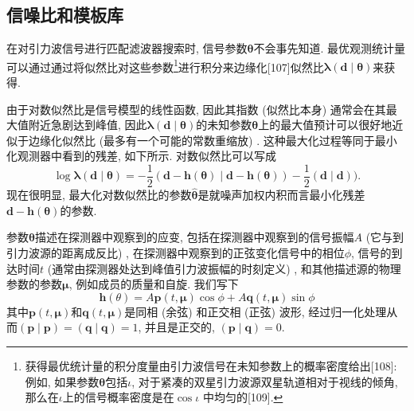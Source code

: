 \documentclass[a4paper]{\documentclassname}
\def\b{\boldsymbol}
\theoremstyle{definition}
\begin{document}
\subsection{信噪比和模板库}

在对引力波信号进行匹配滤波器搜索时, 信号参数$\b{\theta}$不会事先知道. 最优观测统计量可以通过通过将似然比对这些参数\footnote{获得最优统计量的积分度量由引力波信号在未知参数上的概率密度给出[108]: 例如, 如果参数$\b{\theta}$包括$\iota$, 对于紧凑的双星引力波源双星轨道相对于视线的倾角, 那么在$\iota$上的信号概率密度是在$\cos \iota$ 中均匀的[109]. }进行积分来边缘化[107]似然比$\b{\lambda} (\b{d}\mid\b{\theta}) $来获得. 

由于对数似然比是信号模型的线性函数, 因此其指数 (似然比本身) 通常会在其最大值附近急剧达到峰值, 因此$\b{\lambda} (\b{d}\mid\b{\theta}) $的未知参数$\b{\theta}$上的最大值预计可以很好地近似于边缘化似然比 (最多有一个可能的常数重缩放) . 这种最大化过程等同于最小化观测器中看到的残差, 如下所示. 对数似然比可以写成
\begin{equation}
    \log\b{\lambda}(\b{d}\mid\b{\theta})=-\frac{1}{2}(\b{d}-\b{h}(\b{\theta}) \mid\b{d}-\b{h}(\b{\theta}))-\frac{1}{2}(\b{d} \mid\b{d})).
\end{equation}
现在很明显, 最大化对数似然比的参数$\hat{\b\theta}$是就噪声加权内积而言最小化残差$\b{d}-\b{h}(\b{\theta})$的参数. 

参数${\b{\theta}}$描述在探测器中观察到的应变, 包括在探测器中观察到的信号振幅$A$ (它与到引力波源的距离成反比) , 在探测器中观察到的正弦变化信号中的相位$\phi$, 信号的到达时间$t$ (通常由探测器处达到峰值引力波振幅的时刻定义) , 和其他描述源的物理参数的参数$\b{\mu}$, 例如成员的质量和自旋. 我们写下
\begin{equation}
    \b{h}(\theta)=A\b{p}(t,\b{\mu})\cos\phi +A\b{q}(t,\b{\mu})\sin\phi
\end{equation}
其中$\b{p}(t,\b{\mu})$和$\b{q}(t,\b{\mu})$是同相 (余弦) 和正交相 (正弦) 波形, 经过归一化处理从而$ ({\b{p}}\mid{\b{p}}) = ({\b{q}}\mid{\b{q}}) =1$, 并且是正交的, $ (\b{p}\mid\b{q}) =0$.
\end{document}
